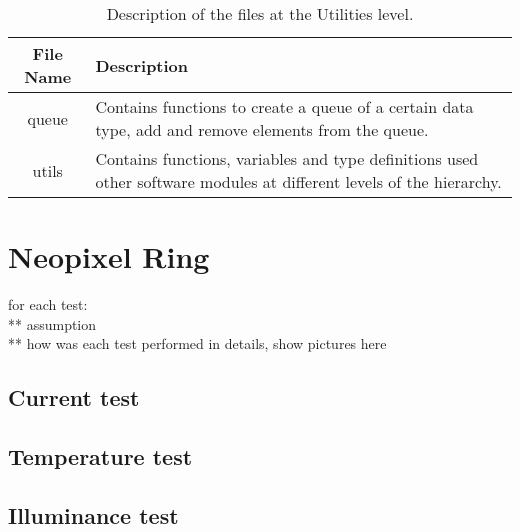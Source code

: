 \begin{table}[h!]
\centering
\caption{Description of the files at the Utilities level.}
\label{table:integrationTest}
\begin{tabular}{cp{30em}}
\hline
\hline
\toprule
\textbf{File Name} & \textbf{Description}\\
\bottomrule
\toprule
queue & Contains functions to create a queue of a certain data type, add and remove elements from the queue. \\
\midrule
utils & Contains functions, variables and type definitions used other software modules at different levels of the hierarchy.\\
\hline
\hline
\end{tabular}
\end{table}

\section{Neopixel Ring}
for each test:\\
** assumption\\
** how was each test performed in details, show pictures here
\subsection{Current test}
\subsection{Temperature test}
\subsection{Illuminance test}
